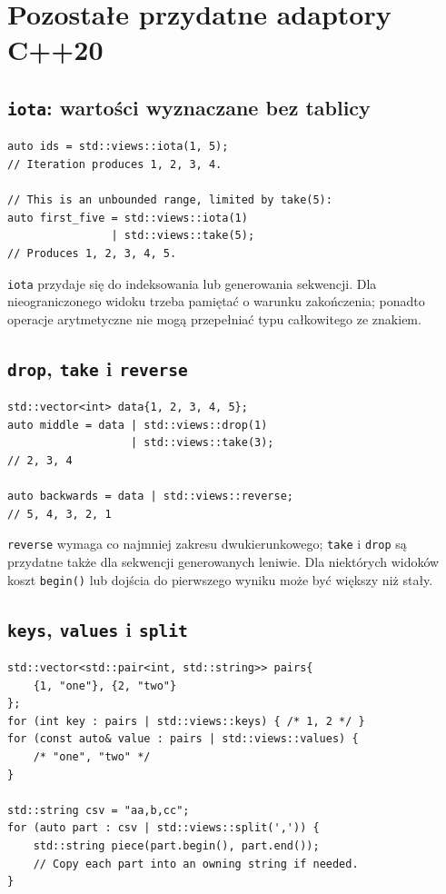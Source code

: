 \section{Pozostałe przydatne adaptory C++20}
\label{sec:cpp8-adaptors}

\subsection{\texttt{iota}: wartości wyznaczane bez tablicy}

\begin{lstlisting}
auto ids = std::views::iota(1, 5);
// Iteration produces 1, 2, 3, 4.

// This is an unbounded range, limited by take(5):
auto first_five = std::views::iota(1)
                | std::views::take(5);
// Produces 1, 2, 3, 4, 5.
\end{lstlisting}

\texttt{iota} przydaje się do indeksowania lub generowania sekwencji.
Dla nieograniczonego widoku trzeba pamiętać o warunku zakończenia;
ponadto operacje arytmetyczne nie mogą przepełniać typu całkowitego
ze znakiem.

\subsection{\texttt{drop}, \texttt{take} i \texttt{reverse}}

\begin{lstlisting}
std::vector<int> data{1, 2, 3, 4, 5};
auto middle = data | std::views::drop(1)
                   | std::views::take(3);
// 2, 3, 4

auto backwards = data | std::views::reverse;
// 5, 4, 3, 2, 1
\end{lstlisting}

\texttt{reverse} wymaga co najmniej zakresu dwukierunkowego;
\texttt{take} i \texttt{drop} są przydatne także dla sekwencji
generowanych leniwie. Dla niektórych widoków koszt \texttt{begin()}
lub dojścia do pierwszego wyniku może być większy niż stały.

\subsection{\texttt{keys}, \texttt{values} i \texttt{split}}

\begin{lstlisting}
std::vector<std::pair<int, std::string>> pairs{
    {1, "one"}, {2, "two"}
};
for (int key : pairs | std::views::keys) { /* 1, 2 */ }
for (const auto& value : pairs | std::views::values) {
    /* "one", "two" */
}

std::string csv = "aa,b,cc";
for (auto part : csv | std::views::split(',')) {
    std::string piece(part.begin(), part.end());
    // Copy each part into an owning string if needed.
}
\end{lstlisting}

